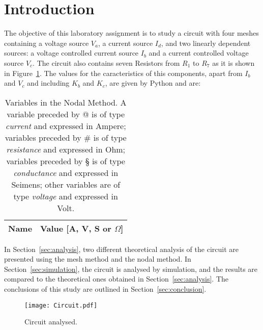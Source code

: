 \section{Introduction}
\label{sec:introduction}

The objective of this laboratory assignment is to study a circuit with four meshes containing a
voltage source $V_a$, a current source $I_d$, and two linearly dependent sources: a voltage controlled current source $I_b$ and a current controlled voltage source $V_c$. The circuit also contains seven Resistors from $R_1$ to $R_7$ as it is shown in Figure~\ref{fig:Circuit_Base}.
The values for the caracteristics of this components, apart from $I_b$ and $V_c$ and including $K_b$ and $K_c$, are given by Python and are:

\begin{table}[h]
  \centering
  \begin{tabular}{|l|r|}
    \hline    
    {\bf Name} & {\bf Value [A, V, S or $\Omega$]} \\ \hline
    
  \end{tabular}
  \caption{Variables in the Nodal Method. A variable preceded by @ is of type {\em current} and expressed in Ampere; variables preceded by \# is of type {\em resistance} and expressed in Ohm; variables preceded by § is of type {\em conductance} and expressed in Seimens; other variables are of type {\em voltage} and expressed in Volt.}
  \label{tab:Enunciado}
\end{table}

In Section~\ref{sec:analysis}, two different theoretical analysis of the circuit are
presented using the mesh method and the nodal method. In Section~\ref{sec:simulation}, the circuit is analysed by
simulation, and the results are compared to the theoretical ones obtained in
Section~\ref{sec:analysis}. The conclusions of this study are outlined in
Section~\ref{sec:conclusion}.

\begin{figure}[h] \centering
\texttt{[image: Circuit.pdf]}
\caption{Circuit analysed.}
\label{fig:Circuit_Base}
\end{figure}